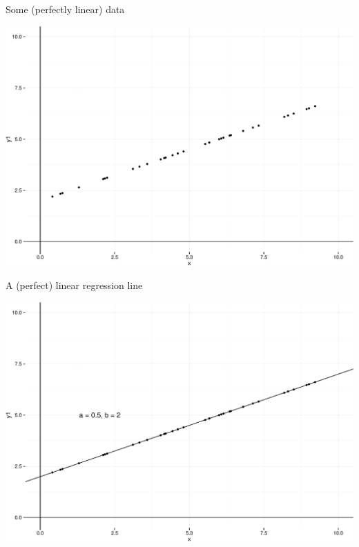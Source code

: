 \documentclass[ignorenonframetext,]{beamer}
\begin{document}
\begin{frame}{Some (perfectly linear) data}

\includegraphics{Regression_files/figure-beamer/unnamed-chunk-2-1.pdf}

\end{frame}

\begin{frame}{A (perfect) linear regression line}

\includegraphics{Regression_files/figure-beamer/unnamed-chunk-3-1.pdf}

\end{frame}
\end{document}
